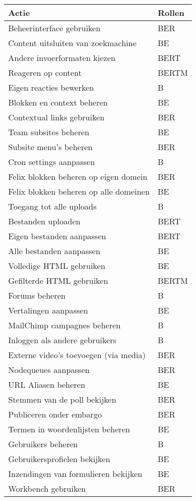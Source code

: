 \begin{tabularx}{\textwidth}{ | p{10cm} | X | } \hline 
\textbf{Actie} & \textbf{Rollen} \\ \hline
Beheerinterface gebruiken 	& BER \\ \hline
Content uitsluiten van zoekmachine 	& BE \\ \hline
Andere invoerformaten kiezen 	& BERT \\ \hline
Reageren op content 	& BERTM \\ \hline
Eigen reacties bewerken 	& B \\ \hline
Blokken en context beheren 	& BE \\ \hline
Contextual links gebruiken 	& BER \\ \hline
Team subsites beheren 	& BE \\ \hline
Subsite menu's beheren 	& BER \\ \hline
Cron settings aanpassen 	& B \\ \hline
Felix blokken beheren op eigen domein 	& BER \\ \hline
Felix blokken beheren op alle domeinen 	& BE \\ \hline
Toegang tot alle uploads 	& B \\ \hline
Bestanden uploaden 	& BERT \\ \hline
Eigen bestanden aanpassen 	& BERT \\ \hline
Alle bestanden aanpassen 	& BE \\ \hline
Volledige HTML gebruiken 	& BE \\ \hline
Gefilterde HTML gebruiken 	& BERTM \\ \hline
Forums beheren 	& B \\ \hline
Vertalingen aanpassen 	& BE \\ \hline
MailChimp campagnes beheren 	& B \\ \hline
Inloggen als andere gebruikers 	& B \\ \hline
Externe video's toevoegen (via media) 	& BER \\ \hline
Nodequeues aanpassen 	& BER \\ \hline
URL Aliasen beheren 	& BE \\ \hline
Stemmen van de poll bekijken 	& BER \\ \hline
Publiceren onder embargo 	& BER \\ \hline
Termen in woordenlijsten beheren 	& BE \\ \hline
Gebruikers beheren 	& B \\ \hline
Gebruikersprofielen bekijken 	& BE \\ \hline
Inzendingen van formulieren bekijken 	& BE \\ \hline
Workbench gebruiken 	& BER \\ \hline
\end{tabularx}


